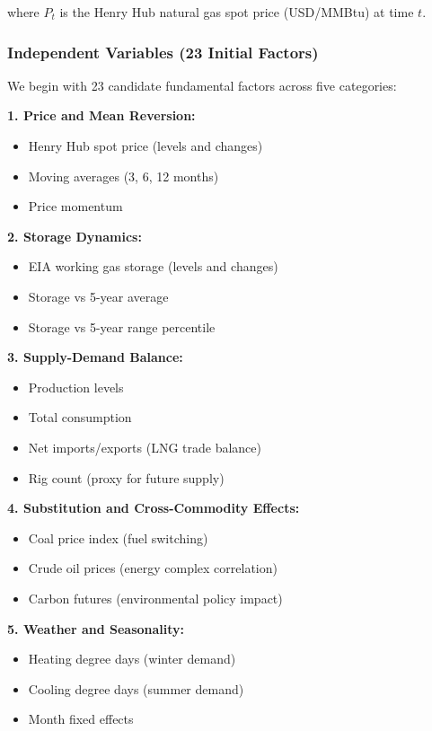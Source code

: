 \documentclass[12pt,a4paper]{article}
\begin{document}
where $P_t$ is the Henry Hub natural gas spot price (USD/MMBtu) at time $t$.

\subsubsection{Independent Variables (23 Initial Factors)}

We begin with 23 candidate fundamental factors across five categories:

\textbf{1. Price and Mean Reversion:}
\begin{itemize}
    \item Henry Hub spot price (levels and changes)
    \item Moving averages (3, 6, 12 months)
    \item Price momentum
\end{itemize}

\textbf{2. Storage Dynamics:}
\begin{itemize}
    \item EIA working gas storage (levels and changes)
    \item Storage vs 5-year average
    \item Storage vs 5-year range percentile
\end{itemize}

\textbf{3. Supply-Demand Balance:}
\begin{itemize}
    \item Production levels
    \item Total consumption
    \item Net imports/exports (LNG trade balance)
    \item Rig count (proxy for future supply)
\end{itemize}

\textbf{4. Substitution and Cross-Commodity Effects:}
\begin{itemize}
    \item Coal price index (fuel switching)
    \item Crude oil prices (energy complex correlation)
    \item Carbon futures (environmental policy impact)
\end{itemize}

\textbf{5. Weather and Seasonality:}
\begin{itemize}
    \item Heating degree days (winter demand)
    \item Cooling degree days (summer demand)
    \item Month fixed effects
\end{itemize}
\end{document}
